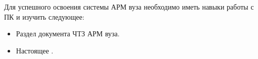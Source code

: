 Для успешного освоения системы АРМ вуза необходимо иметь навыки работы с ПК и изучить следующее:
\begin{itemize}
	\item Раздел  документа ЧТЗ АРМ вуза.
	\item Настоящее .
\end{itemize}
